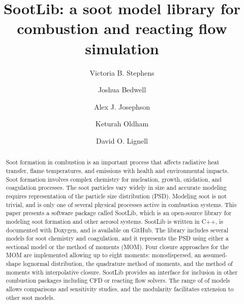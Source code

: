 \documentclass[preprint,letterpaper]{elsarticle}
\begin{document}
\begin{frontmatter}



\title{SootLib: a soot model library for combustion and reacting flow simulation}


\author{Victoria B. Stephens}
\author{Joshua Bedwell}
\author{Alex J. Josephson}
\author{Keturah Oldham}
\author{David O. Lignell}


\address{Chemical Engineering Department, Brigham Young University, Provo, UT 84602, USA}


\begin{abstract}
%
Soot formation in combustion is an important process that affects radiative heat transfer, flame temperatures, and emissions with health and environmental impacts. Soot formation involves complex chemistry for nucleation, growth, oxidation, and coagulation processes. The soot particles vary widely in size and accurate modeling requires representation of the particle size distribution (PSD). Modeling soot is not trivial, and is only one of several physical processes active in combustion systems. This paper presents a software package called SootLib, which is an open-source library for modeling soot formation and other aerosol systems. SootLib is written in C++, is documented with Doxygen, and is available on GitHub. The library includes several models for soot chemistry and coagulation, and it represents the PSD using either a sectional model or the method of moments (MOM). Four closure approaches for the MOM are implemented allowing up to eight moments: monodispersed, an assumed-shape lognormal distribution, the quadrature method of moments, and the method of moments with interpolative closure. SootLib provides an interface for inclusion in other combustion packages including CFD or reacting flow solvers. The range of of models allows comparisons and sensitivity studies, and the modularity facilitates extension to other soot models.
%
\end{abstract}


\end{frontmatter}
\end{document}
